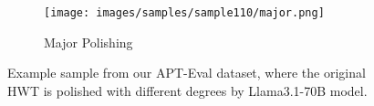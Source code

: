 \begin{figure*}[htbp]
    \vspace{0.5cm} %
    \begin{minipage}{\textwidth} %
        \centering
        \begin{subfigure}{0.7\textwidth}
            \centering
            \texttt{[image: images/samples/sample110/major.png]}
            \caption{Major Polishing}
        \end{subfigure}
    \end{minipage}
    
    
    \caption{Example sample from our APT-Eval dataset, where the original HWT is polished with different degrees by Llama3.1-70B model.}
    \label{fig:sample_exmpl_110}
\end{figure*}